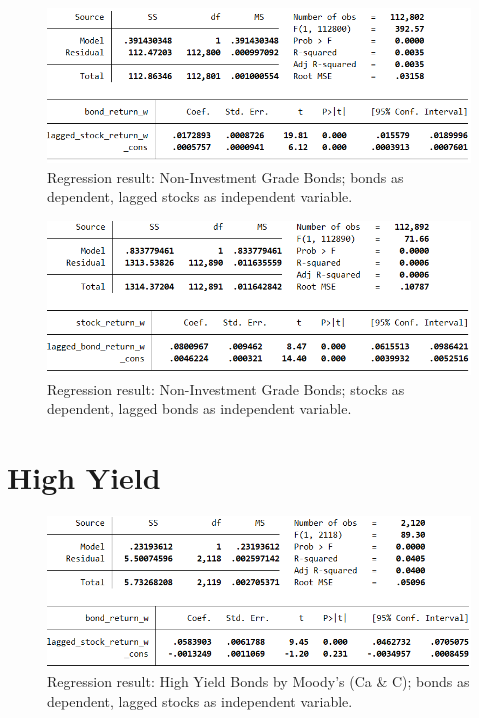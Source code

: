 \begin{figure}[H]
	\centering
	\includegraphics[width=1.0\linewidth]{figures/regression-results/regression-non-investment-grade-bonds-as-dependent.PNG}
	\caption{Regression result: Non-Investment Grade Bonds; bonds as dependent, lagged stocks as independent variable. }
	\label{fig:regression-non-investment-grade-bonds-as-dependent}
\end{figure}

\begin{figure}[H]
	\centering
	\includegraphics[width=1.0\linewidth]{figures/regression-results/regression-non-investment-grade-stocks-as-dependent.PNG}
	\caption{Regression result: Non-Investment Grade Bonds; stocks as dependent, lagged bonds as independent variable. }
	\label{fig:regression-non-investment-grade-stocks-as-dependent}
\end{figure}

\section{High Yield}

\begin{figure}[H]
	\centering
	\includegraphics[width=1.0\linewidth]{figures/regression-results/regression-high-yield-ccc-d-moodies-bonds-as-dependent.PNG}
	\caption{Regression result: High Yield Bonds by Moody's (Ca \& C); bonds as dependent, lagged stocks as independent variable. }
	\label{fig:regression-high-yield-moodys-bonds-as-dependent}
\end{figure}

